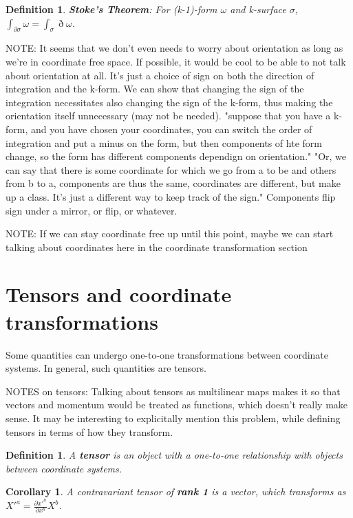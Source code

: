 \documentclass{book}
\newtheorem{defn}[equation]{Definition}
\newtheorem{coro}[equation]{Corollary}
\begin{document}
\begin{defn}
	\textbf{Stoke's Theorem}: For (k-1)-form $\omega$ and k-surface $\sigma$, $\int_{\partial \sigma}\omega = \int_{\sigma}\eth\omega$. 
\end{defn}

NOTE: It seems that we don't even needs to worry about orientation as long as we're in coordinate free space. If possible, it would be cool to be able to not talk about orientation at all. It's just a choice of sign on both the direction of integration and the k-form. We can show that changing the sign of the integration necessitates also changing the sign of the k-form, thus making the orientation itself unnecessary (may not be needed). "suppose that you have a k-form, and you have chosen your coordinates, you can switch the order of integration and put a minus on the form, but then components of hte form change, so the form has different components dependign on orientation." "Or, we can say that there is some coordinate for which we go from a to be and others from b to a, components are thus the same, coordinates are different, but make up a class. It's just a different way to keep track of the sign." Components flip sign under a mirror, or flip, or whatever. 

NOTE: If we can stay coordinate free up until this point, maybe we can start talking about coordinates here in the coordinate transformation section
\section{Tensors and coordinate transformations}
Some quantities can undergo one-to-one transformations between coordinate systems. In general, such quantities are tensors. 

NOTES on tensors: Talking about tensors as multilinear maps makes it so that vectors and momentum would be treated as functions, which doesn't really make sense. It may be interesting to explicitally mention this problem, while defining tensors in terms of how they transform. 


\begin{defn}
	A \textbf{tensor} is an object with a one-to-one relationship with objects between coordinate systems. 
\end{defn}

\begin{coro}
	A contravariant tensor of \textbf{rank 1} is a vector, which transforms as  $X'^a = \frac{\partial x'^a}{\partial x^b} X^b$.  
\end{coro}
\end{document}
